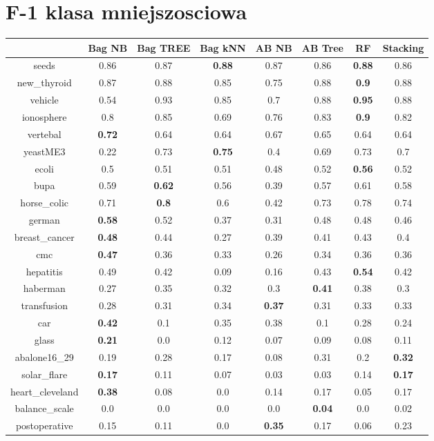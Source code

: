\documentclass{article}%
\begin{document}
%
\section*{F{-}1 klasa mniejszosciowa}%
\begin{tabular}{c|ccccccc}%
&Bag NB&Bag TREE&Bag kNN&AB NB&AB Tree&RF&Stacking\\%
\hline%
seeds&0.86&0.87&\textbf{0.88}&0.87&0.86&\textbf{0.88}&0.86\\%
new\_thyroid&0.87&0.88&0.85&0.75&0.88&\textbf{0.9}&0.88\\%
vehicle&0.54&0.93&0.85&0.7&0.88&\textbf{0.95}&0.88\\%
ionosphere&0.8&0.85&0.69&0.76&0.83&\textbf{0.9}&0.82\\%
vertebal&\textbf{0.72}&0.64&0.64&0.67&0.65&0.64&0.64\\%
yeastME3&0.22&0.73&\textbf{0.75}&0.4&0.69&0.73&0.7\\%
ecoli&0.5&0.51&0.51&0.48&0.52&\textbf{0.56}&0.52\\%
bupa&0.59&\textbf{0.62}&0.56&0.39&0.57&0.61&0.58\\%
horse\_colic&0.71&\textbf{0.8}&0.6&0.42&0.73&0.78&0.74\\%
german&\textbf{0.58}&0.52&0.37&0.31&0.48&0.48&0.46\\%
breast\_cancer&\textbf{0.48}&0.44&0.27&0.39&0.41&0.43&0.4\\%
cmc&\textbf{0.47}&0.36&0.33&0.26&0.34&0.36&0.36\\%
hepatitis&0.49&0.42&0.09&0.16&0.43&\textbf{0.54}&0.42\\%
haberman&0.27&0.35&0.32&0.3&\textbf{0.41}&0.38&0.3\\%
transfusion&0.28&0.31&0.34&\textbf{0.37}&0.31&0.33&0.33\\%
car&\textbf{0.42}&0.1&0.35&0.38&0.1&0.28&0.24\\%
glass&\textbf{0.21}&0.0&0.12&0.07&0.09&0.08&0.11\\%
abalone16\_29&0.19&0.28&0.17&0.08&0.31&0.2&\textbf{0.32}\\%
solar\_flare&\textbf{0.17}&0.11&0.07&0.03&0.03&0.14&\textbf{0.17}\\%
heart\_cleveland&\textbf{0.38}&0.08&0.0&0.14&0.17&0.05&0.17\\%
balance\_scale&0.0&0.0&0.0&0.0&\textbf{0.04}&0.0&0.02\\%
postoperative&0.15&0.11&0.0&\textbf{0.35}&0.17&0.06&0.23\\%
\end{tabular}

%
\end{document}

